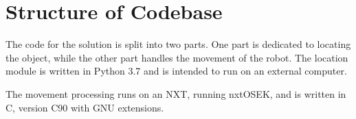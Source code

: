 \section{Structure of Codebase}
The code for the solution is split into two parts.
One part is dedicated to locating the object, while the other part handles the movement of the robot.
The location module is written in Python 3{.}7 and is intended to run on an external computer.

The movement processing runs on an NXT, running nxtOSEK, and is written in C, version C90 with GNU extensions.



